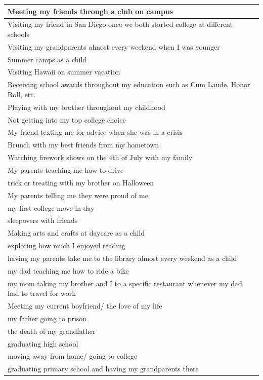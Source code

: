 \documentclass[
  .7em,
  letterpaper,
  DIV=11,
  numbers=noendperiod]{scrartcl}
\begin{document}
\begin{table}
\begin{tabular}{l}
\hline
Meeting my friends through a club on campus\\
\hline
Visiting my friend in San Diego once we both started college at different schools\\
\hline
Visiting my grandparents almost every weekend when I was younger\\
\hline
Summer camps as a child\\
\hline
Visiting Hawaii on summer vacation\\
\hline
Receiving school awards throughout my education such as Cum Laude, Honor Roll, etc.\\
\hline
Playing with my brother throughout my childhood\\
\hline
Not getting into my top college choice\\
\hline
My friend texting me for advice when she was in a crisis\\
\hline
Brunch with my best friends from my hometown\\
\hline
Watching firework shows on the 4th of July with my family\\
\hline
My parents teaching me how to drive\\
\hline
trick or treating with my brother on Halloween\\
\hline
My parents telling me they were proud of me\\
\hline
my first college move in day\\
\hline
sleepovers with friends\\
\hline
Making arts and crafts at daycare as a child\\
\hline
exploring how much I enjoyed reading\\
\hline
having my parents take me to the library almost every weekend as a child\\
\hline
my dad teaching me how to ride a bike\\
\hline
my mom taking my brother and I to a specific restaurant whenever my dad had to travel for work\\
\hline
Meeting my current boyfriend/ the love of my life\\
\hline
my father going to prison\\
\hline
the death of my grandfather\\
\hline
graduating high school\\
\hline
moving away from home/ going to college\\
\hline
graduating primary school and having my grandparents there\\
\hline

\end{tabular}
\end{table}
\end{document}
